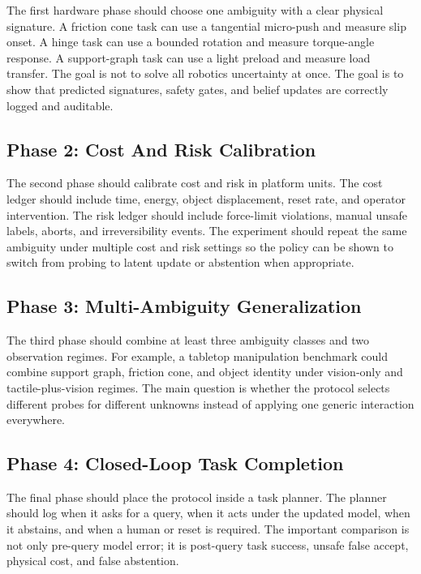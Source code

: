 \documentclass{article}
\begin{document}
The first hardware phase should choose one ambiguity with a clear physical signature. A friction cone task can use a tangential micro-push and measure slip onset. A hinge task can use a bounded rotation and measure torque-angle response. A support-graph task can use a light preload and measure load transfer. The goal is not to solve all robotics uncertainty at once. The goal is to show that predicted signatures, safety gates, and belief updates are correctly logged and auditable.

\subsection{Phase 2: Cost And Risk Calibration}

The second phase should calibrate cost and risk in platform units. The cost ledger should include time, energy, object displacement, reset rate, and operator intervention. The risk ledger should include force-limit violations, manual unsafe labels, aborts, and irreversibility events. The experiment should repeat the same ambiguity under multiple cost and risk settings so the policy can be shown to switch from probing to latent update or abstention when appropriate.

\subsection{Phase 3: Multi-Ambiguity Generalization}

The third phase should combine at least three ambiguity classes and two observation regimes. For example, a tabletop manipulation benchmark could combine support graph, friction cone, and object identity under vision-only and tactile-plus-vision regimes. The main question is whether the protocol selects different probes for different unknowns instead of applying one generic interaction everywhere.

\subsection{Phase 4: Closed-Loop Task Completion}

The final phase should place the protocol inside a task planner. The planner should log when it asks for a query, when it acts under the updated model, when it abstains, and when a human or reset is required. The important comparison is not only pre-query model error; it is post-query task success, unsafe false accept, physical cost, and false abstention.
\end{document}
